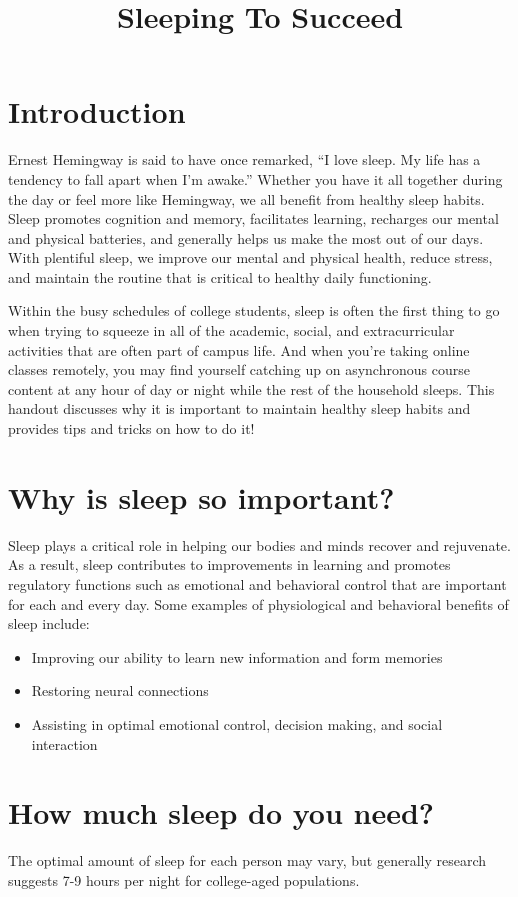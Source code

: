 \documentclass[../main.tex]{subfiles}
\title{Sleeping To Succeed}
\begin{document}
\maketitle
%
\section{Introduction}
Ernest Hemingway is said to have once remarked, ``I love sleep. My life has a
tendency to fall apart when I'm awake.'' Whether you have it all together during
the day or feel more like Hemingway, we all benefit from healthy sleep habits.
Sleep promotes cognition and memory, facilitates learning, recharges our mental
and physical batteries, and generally helps us make the most out of our days.
With plentiful sleep, we improve our mental and physical health, reduce stress,
and maintain the routine that is critical to healthy daily functioning.

Within the busy schedules of college students, sleep is often the first thing to
go when trying to squeeze in all of the academic, social, and extracurricular
activities that are often part of campus life. And when you're taking online
classes remotely, you may find yourself catching up on asynchronous course
content at any hour of day or night while the rest of the household sleeps. This
handout discusses why it is important to maintain healthy sleep habits and
provides tips and tricks on how to do it!
%
\section{Why is sleep so important?}
Sleep plays a critical role in helping our bodies and minds recover and
rejuvenate. As a result, sleep contributes to improvements in learning and
promotes regulatory functions such as emotional and behavioral control that are
important for each and every day. Some examples of physiological and behavioral
benefits of sleep include:
%
\begin{itemize}
  \item Improving our ability to learn new information and form memories
  \item Restoring neural connections
  \item Assisting in optimal emotional control, decision making, and social interaction
\end{itemize}
%
\section{How much sleep do you need?}
The optimal amount of sleep for each person may vary, but generally research
suggests 7-9 hours per night for college-aged populations.
%
\end{document}
